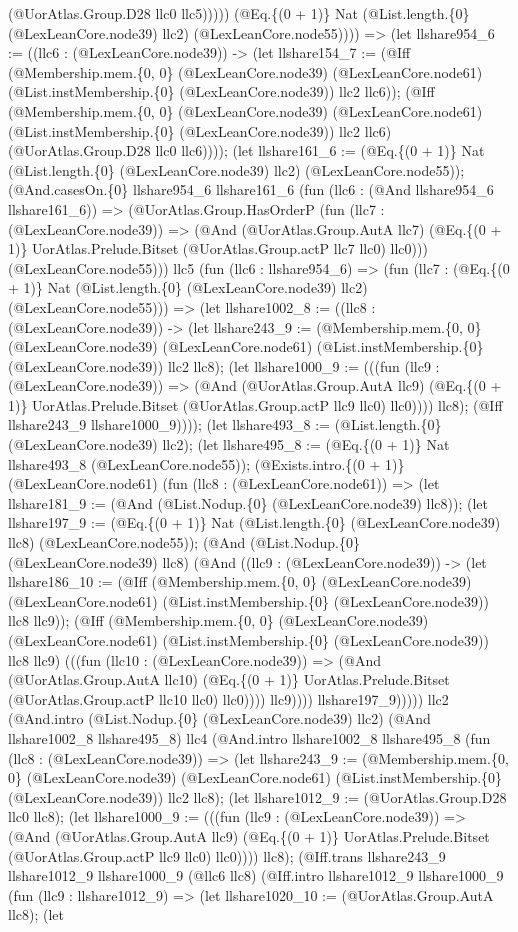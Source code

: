 \documentclass[11pt]{article}
\begin{document}
(@UorAtlas.Group.D28 llc0 llc5))))) (@Eq.\{(0 + 1)\} Nat (@List.length.\{0\} (@LexLeanCore.node39) llc2) (@LexLeanCore.node55)))) => (let llshare954\_6 := ((llc6 : (@LexLeanCore.node39)) -> (let llshare154\_7 := (@Iff (@Membership.mem.\{0, 0\} (@LexLeanCore.node39) (@LexLeanCore.node61) (@List.instMembership.\{0\} (@LexLeanCore.node39)) llc2 llc6)); (@Iff (@Membership.mem.\{0, 0\} (@LexLeanCore.node39) (@LexLeanCore.node61) (@List.instMembership.\{0\} (@LexLeanCore.node39)) llc2 llc6) (@UorAtlas.Group.D28 llc0 llc6)))); (let llshare161\_6 := (@Eq.\{(0 + 1)\} Nat (@List.length.\{0\} (@LexLeanCore.node39) llc2) (@LexLeanCore.node55)); (@And.casesOn.\{0\} llshare954\_6 llshare161\_6 (fun (llc6 : (@And llshare954\_6 llshare161\_6)) => (@UorAtlas.Group.HasOrderP (fun (llc7 : (@LexLeanCore.node39)) => (@And (@UorAtlas.Group.AutA llc7) (@Eq.\{(0 + 1)\} UorAtlas.Prelude.Bitset (@UorAtlas.Group.actP llc7 llc0) llc0))) (@LexLeanCore.node55))) llc5 (fun (llc6 : llshare954\_6) => (fun (llc7 : (@Eq.\{(0 + 1)\} Nat (@List.length.\{0\} (@LexLeanCore.node39) llc2) (@LexLeanCore.node55))) => (let llshare1002\_8 := ((llc8 : (@LexLeanCore.node39)) -> (let llshare243\_9 := (@Membership.mem.\{0, 0\} (@LexLeanCore.node39) (@LexLeanCore.node61) (@List.instMembership.\{0\} (@LexLeanCore.node39)) llc2 llc8); (let llshare1000\_9 := (((fun (llc9 : (@LexLeanCore.node39)) => (@And (@UorAtlas.Group.AutA llc9) (@Eq.\{(0 + 1)\} UorAtlas.Prelude.Bitset (@UorAtlas.Group.actP llc9 llc0) llc0)))) llc8); (@Iff llshare243\_9 llshare1000\_9)))); (let llshare493\_8 := (@List.length.\{0\} (@LexLeanCore.node39) llc2); (let llshare495\_8 := (@Eq.\{(0 + 1)\} Nat llshare493\_8 (@LexLeanCore.node55)); (@Exists.intro.\{(0 + 1)\} (@LexLeanCore.node61) (fun (llc8 : (@LexLeanCore.node61)) => (let llshare181\_9 := (@And (@List.Nodup.\{0\} (@LexLeanCore.node39) llc8)); (let llshare197\_9 := (@Eq.\{(0 + 1)\} Nat (@List.length.\{0\} (@LexLeanCore.node39) llc8) (@LexLeanCore.node55)); (@And (@List.Nodup.\{0\} (@LexLeanCore.node39) llc8) (@And ((llc9 : (@LexLeanCore.node39)) -> (let llshare186\_10 := (@Iff (@Membership.mem.\{0, 0\} (@LexLeanCore.node39) (@LexLeanCore.node61) (@List.instMembership.\{0\} (@LexLeanCore.node39)) llc8 llc9)); (@Iff (@Membership.mem.\{0, 0\} (@LexLeanCore.node39) (@LexLeanCore.node61) (@List.instMembership.\{0\} (@LexLeanCore.node39)) llc8 llc9) (((fun (llc10 : (@LexLeanCore.node39)) => (@And (@UorAtlas.Group.AutA llc10) (@Eq.\{(0 + 1)\} UorAtlas.Prelude.Bitset (@UorAtlas.Group.actP llc10 llc0) llc0)))) llc9)))) llshare197\_9))))) llc2 (@And.intro (@List.Nodup.\{0\} (@LexLeanCore.node39) llc2) (@And llshare1002\_8 llshare495\_8) llc4 (@And.intro llshare1002\_8 llshare495\_8 (fun (llc8 : (@LexLeanCore.node39)) => (let llshare243\_9 := (@Membership.mem.\{0, 0\} (@LexLeanCore.node39) (@LexLeanCore.node61) (@List.instMembership.\{0\} (@LexLeanCore.node39)) llc2 llc8); (let llshare1012\_9 := (@UorAtlas.Group.D28 llc0 llc8); (let llshare1000\_9 := (((fun (llc9 : (@LexLeanCore.node39)) => (@And (@UorAtlas.Group.AutA llc9) (@Eq.\{(0 + 1)\} UorAtlas.Prelude.Bitset (@UorAtlas.Group.actP llc9 llc0) llc0)))) llc8); (@Iff.trans llshare243\_9 llshare1012\_9 llshare1000\_9 (@llc6 llc8) (@Iff.intro llshare1012\_9 llshare1000\_9 (fun (llc9 : llshare1012\_9) => (let llshare1020\_10 := (@UorAtlas.Group.AutA llc8); (let 
\end{document}
